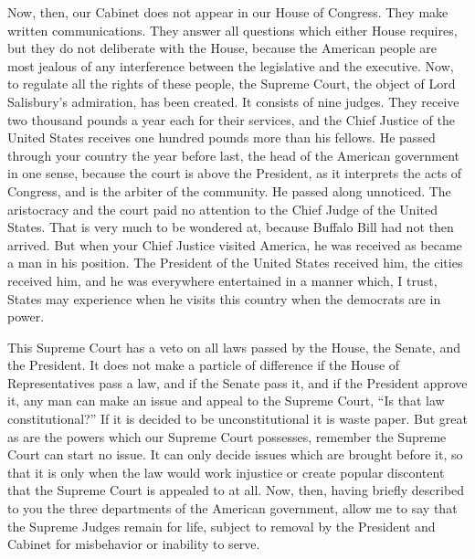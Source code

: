 \documentclass[11pt,openany]{book}
\begin{document}
Now, then, our Cabinet does not appear in our House of Congress. They make written communications. They answer all questions which either House requires, but they do not deliberate with the House, because the American people are most jealous of any interference between the legislative and the executive. Now, to regulate all the rights of these people, the Supreme Court, the object of Lord Salisbury's admiration, has been created. It consists of nine judges. They receive two thousand pounds a year each for their services, and the Chief Justice of the United States receives one hundred pounds more than his fellows. He passed through your country the year before last, the head of the American government in one sense, because the court is above the President, as it interprets the acts of Congress, and is the arbiter of the community. He passed along unnoticed. The aristocracy and the court paid no attention to the Chief Judge of the United States. That is very much to be wondered at, because Buffalo Bill had not then arrived. But when your Chief Justice visited America, he was received as became a man in his position. The President of the United States received him, the cities received him, and he was everywhere entertained in a manner which, I trust, States may experience when he visits this country when the democrats are in power.

This Supreme Court has a veto on all laws passed by the House, the Senate, and the President. It does not make a particle of difference if the House of Representatives pass a law, and if the Senate pass it, and if the President approve it, any man can make an issue and appeal to the Supreme Court, ``Is that law constitutional?'' If it is decided to be unconstitutional it is waste paper. But great as are the powers which our Supreme Court possesses, remember the Supreme Court can start no issue. It can only decide issues which are brought before it, so that it is only when the law would work injustice or create popular discontent that the Supreme Court is appealed to at all. Now, then, having briefly described to you the three departments of the American government, allow me to say that the Supreme Judges remain for life, subject to removal by the President and Cabinet for misbehavior or inability to serve.
\end{document}
